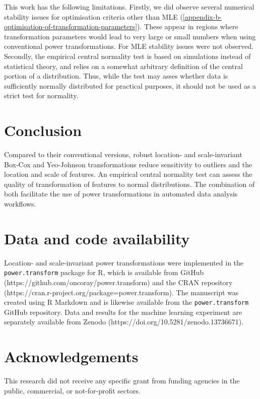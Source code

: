 \documentclass[preprint,12pt,authoryear]{elsarticle}
\begin{document}
This work has the following limitations. Firstly, we did observe several
numerical stability issues for optimisation criteria other than MLE
(\ref{appendix-b-optimisation-of-transformation-parameters}).
These appear in regions where transformation parameters
would lead to very large or small numbers when using conventional power
transformations. For MLE stability issues were not observed. Secondly,
the empirical central normality test is based on simulations instead of
statistical theory, and relies on a somewhat arbitrary definition of the
central portion of a distribution. Thus, while the test may asses
whether data is sufficiently normally distributed for practical
purposes, it should not be used as a strict test for normality.

\section{Conclusion}\label{conclusion}

Compared to their conventional versions, robust location- and
scale-invariant Box-Cox and Yeo-Johnson transformations reduce
sensitivity to outliers and the location and scale of features. An
empirical central normality test can assess the quality of
transformation of features to normal distributions. The combination of
both facilitate the use of power transformations in automated data
analysis workflows.

\section{Data and code availability}\label{data-and-code-availability}

Location- and scale-invariant power transformations were implemented in
the \texttt{power.transform} package for R, which is available from
GitHub (https://github.com/oncoray/power.transform) and the CRAN
repository (https://cran.r-project.org/package=power.transform).
The manuscript was created using R Markdown and is likewise
available from the \texttt{power.transform} GitHub repository. Data and
results for the machine learning experiment are separately available
from Zenodo (https://doi.org/10.5281/zenodo.13736671).

\section{Acknowledgements}\label{sec:acknowledgments}

This research did not receive any specific grant from funding agencies in the public, commercial, or not-for-profit sectors.
\end{document}
